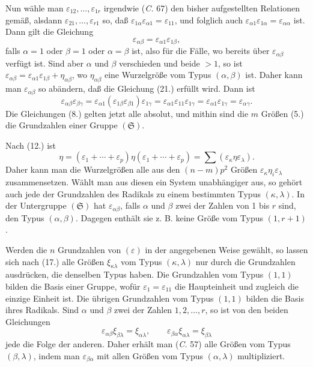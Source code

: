 \documentclass[11pt]{article}
\newcommand{\eps}{\varepsilon}
\newcommand{\grS}{\mathfrak{S}}
\begin{document}
Nun wähle man $\eps_{12},\ldots,\eps_{1r}$ irgendwie (\emph{C.} 67) den bisher aufgestellten Relationen gemäß, alsdann $\eps_{21},\ldots,\eps_{r1}$ so, daß $\eps_{1\alpha}\eps_{\alpha1}=\eps_{11}$, und folglich auch $\eps_{\alpha1}\eps_{1\alpha}=\eps_{\alpha\alpha}$ ist. Dann gilt die Gleichung
\begin{equation}\tag{21.}
 \eps_{\alpha\beta}=\eps_{\alpha1}\eps_{1\beta},
\end{equation}
falls $\alpha=1$ oder $\beta=1$ oder $\alpha=\beta$ ist, also für die Fälle, wo bereits über $\eps_{\alpha\beta}$ verfügt ist. Sind aber $\alpha$ und $\beta$ verschieden und beide $>1$, so ist $\eps_{\alpha\beta}=\eps_{\alpha1}\eps_{1\beta}+\eta_{\alpha\beta}$, wo $\eta_{\alpha\beta}$ eine Wurzelgröße vom Typus $(\alpha,\beta)$ ist. Daher kann man $\eps_{\alpha\beta}$ so abändern, daß die Gleichung (21.) erfüllt wird. Dann ist
\[
 \eps_{\alpha\beta}\eps_{\beta\gamma}
 =\eps_{\alpha1}(\eps_{1\beta}\eps_{\beta1})\eps_{1\gamma}
 =\eps_{\alpha1}\eps_{11}\eps_{1\gamma}
 =\eps_{\alpha1}\eps_{1\gamma}
 =\eps_{\alpha\gamma}.
\]
Die Gleichungen (8.) gelten jetzt alle absolut, und mithin sind die $m$ Größen (5.) die Grundzahlen einer Gruppe $(\grS)$.

Nach (12.) ist
\[
 \eta=(\eps_1+\cdots+\eps_p)\eta(\eps_1+\cdots+\eps_p)=\sum(\eps_\kappa\eta\eps_\lambda).
\]
Daher kann man die Wurzelgrößen alle aus den $(n-m)p^2$ Größen $\eps_\kappa\eta_i\eps_\lambda$ zusammensetzen. Wählt man aus diesen ein System unabhängiger aus, so gehört auch jede der Grundzahlen des Radikals zu einem bestimmten Typus $(\kappa,\lambda)$. In der Untergruppe $(\grS)$ hat $\eps_{\alpha\beta}$, falls $\alpha$ und $\beta$ zwei der Zahlen von 1 bis $r$ sind, den Typus $(\alpha,\beta)$. Dagegen enthält sie z. B. keine Größe vom Typus $(1,r+1)$.

Werden die $n$ Grundzahlen von $(\eps)$ in der angegebenen Weise gewählt, so lassen sich nach (17.) alle Größen $\xi_{\kappa\lambda}$ vom Typus $(\kappa,\lambda)$ nur durch die Grundzahlen ausdrücken, die denselben Typus haben. Die Grundzahlen vom Typus $(1,1)$ bilden die Basis einer Gruppe, wofür $\eps_1=\eps_{11}$ die Haupteinheit und zugleich die einzige Einheit ist. Die übrigen Grundzahlen vom Typus $(1,1)$ bilden die Basis ihres Radikals. Sind $\alpha$ und $\beta$ zwei der Zahlen $1,2,\ldots,r$, so ist von den beiden Gleichungen
\[
 \eps_{\alpha\beta}\xi_{\beta\lambda}=\xi_{\alpha\lambda},
 \qquad
 \eps_{\beta\alpha}\xi_{\alpha\lambda}=\xi_{\beta\lambda}
\]
jede die Folge der anderen. Daher erhält man (\emph{C.} 57) alle Größen vom Typus $(\beta,\lambda)$, indem man $\eps_{\beta\alpha}$ mit allen Größen vom Typus $(\alpha,\lambda)$ multipliziert.
\end{document}
